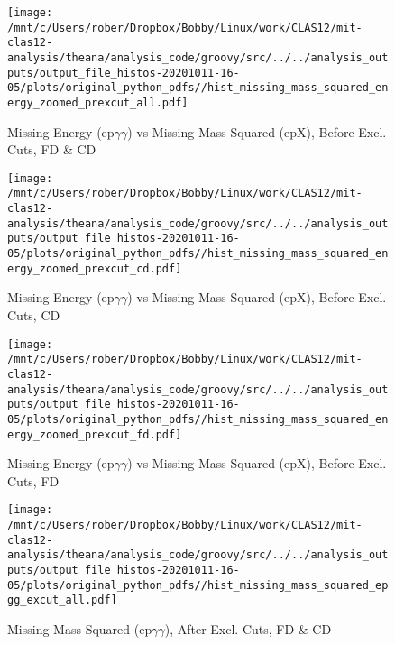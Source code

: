 \documentclass{article}
\begin{document}
\begin{landscape}
    \begin{figure}[h]
        \centering

        \texttt{[image: /mnt/c/Users/rober/Dropbox/Bobby/Linux/work/CLAS12/mit-clas12-analysis/theana/analysis\_code/groovy/src/../../analysis\_outputs/output\_file\_histos-20201011-16-05/plots/original\_python\_pdfs//hist\_missing\_mass\_squared\_energy\_zoomed\_prexcut\_all.pdf]}
        \captionsetup{textformat=empty,labelformat=blank}
        \caption{Missing Energy (ep$\gamma$$\gamma$) vs Missing Mass Squared (epX), Before Excl. Cuts, FD \& CD}
    \end{figure}
    \clearpage
    
    \begin{figure}[h]
        \centering

        \texttt{[image: /mnt/c/Users/rober/Dropbox/Bobby/Linux/work/CLAS12/mit-clas12-analysis/theana/analysis\_code/groovy/src/../../analysis\_outputs/output\_file\_histos-20201011-16-05/plots/original\_python\_pdfs//hist\_missing\_mass\_squared\_energy\_zoomed\_prexcut\_cd.pdf]}
        \captionsetup{textformat=empty,labelformat=blank}
        \caption{Missing Energy (ep$\gamma$$\gamma$) vs Missing Mass Squared (epX), Before Excl. Cuts, CD}
    \end{figure}
    \clearpage
    
    \begin{figure}[h]
        \centering

        \texttt{[image: /mnt/c/Users/rober/Dropbox/Bobby/Linux/work/CLAS12/mit-clas12-analysis/theana/analysis\_code/groovy/src/../../analysis\_outputs/output\_file\_histos-20201011-16-05/plots/original\_python\_pdfs//hist\_missing\_mass\_squared\_energy\_zoomed\_prexcut\_fd.pdf]}
        \captionsetup{textformat=empty,labelformat=blank}
        \caption{Missing Energy (ep$\gamma$$\gamma$) vs Missing Mass Squared (epX), Before Excl. Cuts, FD}
    \end{figure}
    \clearpage
    
    \begin{figure}[h]
        \centering

        \texttt{[image: /mnt/c/Users/rober/Dropbox/Bobby/Linux/work/CLAS12/mit-clas12-analysis/theana/analysis\_code/groovy/src/../../analysis\_outputs/output\_file\_histos-20201011-16-05/plots/original\_python\_pdfs//hist\_missing\_mass\_squared\_epgg\_excut\_all.pdf]}
        \captionsetup{textformat=empty,labelformat=blank}
        \caption{Missing Mass Squared (ep$\gamma$$\gamma$), After Excl. Cuts, FD \& CD}
    \end{figure}
    \clearpage
    

\end{landscape}
\end{document}
